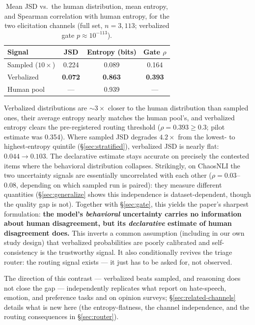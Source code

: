 \documentclass[11pt]{article}
\begin{document}
\begin{table}[t]
\centering
\small
\setlength{\tabcolsep}{4pt}
\begin{tabular}{lccc}
\toprule
Signal & JSD & Entropy (bits) & Gate $\rho$ \\
\midrule
Sampled ($10\times$) & 0.224 & 0.089 & 0.164 \\
Verbalized & \textbf{0.072} & \textbf{0.863} & \textbf{0.393} \\
Human pool & --- & 0.939 & --- \\
\bottomrule
\end{tabular}
\caption{Mean JSD vs.\ the human distribution, mean entropy, and Spearman correlation with human entropy, for the two elicitation channels (full set, $n = 3{,}113$; verbalized gate $p \approx 10^{-113}$).}
\label{tab:verbalized}
\end{table}

Verbalized distributions are ${\sim}3\times$ closer to the human distribution than sampled ones, their average entropy nearly matches the human pool's, and verbalized entropy clears the pre-registered routing threshold ($\rho = 0.393 \geq 0.3$; pilot estimate was 0.354). Where sampled JSD degrades $4.2\times$ from the lowest- to highest-entropy quintile (\S\ref{sec:stratified}), verbalized JSD is nearly flat: $0.044 \rightarrow 0.103$. The declarative estimate stays accurate on precisely the contested items where the behavioral distribution collapses. Strikingly, on ChaosNLI the two uncertainty signals are essentially uncorrelated with each other ($\rho = 0.03$--$0.08$, depending on which sampled run is paired): they measure different quantities (\S\ref{sec:generalize} shows this independence is dataset-dependent, though the quality gap is not). Together with \S\ref{sec:gate}, this yields the paper's sharpest formulation: \textbf{the model's \emph{behavioral} uncertainty carries no information about human disagreement, but its \emph{declarative} estimate of human disagreement does.} This inverts a common assumption (including in our own study design) that verbalized probabilities are poorly calibrated and self-consistency is the trustworthy signal. It also conditionally revives the triage router: the routing signal exists --- it just has to be asked for, not observed.

The direction of this contrast --- verbalized beats sampled, and reasoning does not close the gap --- independently replicates what \citet{ni2026reasoning} report on hate-speech, emotion, and preference tasks and \citet{meister2025benchmarking} on opinion surveys; \S\ref{sec:related-channels} details what is new here (the entropy-flatness, the channel independence, and the routing consequences in \S\ref{sec:router}).
\end{document}
